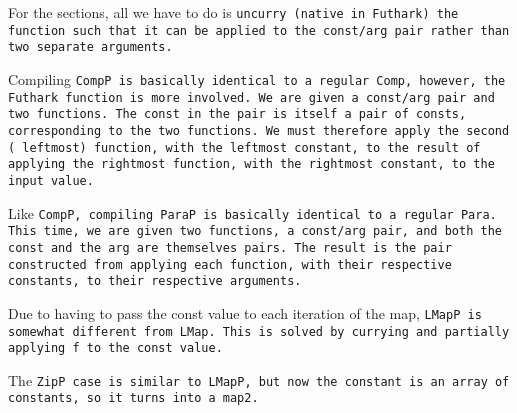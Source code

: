 
For the sections, all we have to do is \tt{uncurry} (native in
Futhark) the function such that it can be applied to the const/arg
pair rather than two separate arguments.



Compiling \tt{CompP} is basically identical to a regular \tt{Comp},
however, the Futhark function is more involved. We are given a const/arg
pair and two functions. The const in the pair is itself a pair of consts,
corresponding to the two functions. We must therefore apply the second (
leftmost) function, with the leftmost constant, to the result of applying
the rightmost function, with the rightmost constant, to the input value.



Like \tt{CompP}, compiling \tt{ParaP} is basically identical to a regular
\tt{Para}. This time, we are given two functions, a const/arg pair, and
both the const and the arg are themselves pairs. The result is the pair
constructed from applying each function, with their respective constants,
to their respective arguments.



Due to having to pass the const value to each iteration of the map,
\tt{LMapP} is somewhat different from \tt{LMap}. This is solved by currying
and partially applying \tt{f} to the const value.



The \tt{ZipP} case is similar to \tt{LMapP}, but now the constant is an
array of constants, so it turns into a \tt{map2}.
